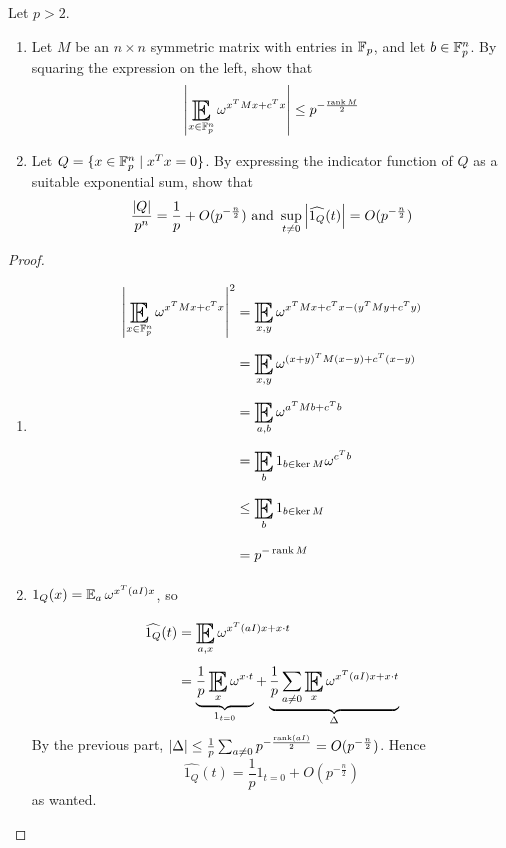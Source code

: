 \documentclass{article}
\begin{document}
\begin{problem}
  Let $p > 2$.
  \begin{enumerate}
    \item Let $M$ be an $n \times n$ symmetric matrix with entries in $\mathbb F_p$, and let $b \in \mathbb F_p^n$. By squaring the expression on the left, show that
    $$\abs{\E_{x \in \F_p^n} \omega^{x^T Mx + c^T x}} \le p^{-\frac{\rank M}2}$$
    \item Let $Q = \{x \in \mathbb F_p^n \mid x^T x = 0\}$. By expressing the indicator function of $Q$ as a suitable exponential sum, show that
    $$\frac{\left\lvert Q\right\rvert}{p^n} = \frac 1p + O(p^{-\frac n2}) \text{ and } \sup_{t \ne 0} \left\lvert \widehat{1_Q}(t)\right\rvert = O(p^{-\frac n2})$$
  \end{enumerate}
\end{problem}
\begin{proof}~
  \begin{enumerate}
    \item
    \begin{align*}
      \abs{\E_{x \in \F_p^n} \omega^{x^T Mx + c^T x}}^2
      & = \E_{x, y} \omega^{x^T Mx + c^T x - (y^T My + c^T y)} \\
      & = \E_{x, y} \omega^{(x + y)^T M(x - y) + c^T(x - y)} \\
      & = \E_{a, b} \omega^{a^T Mb + c^Tb} \\
      & = \E_b 1_{b \in \ker M} \omega^{c^Tb} \\
      & \le \E_b 1_{b \in \ker M} \\
      & = p^{-\rank M}
    \end{align*}
    \item $1_Q(x) = \E_a \omega^{x^T(aI)x}$, so
    \begin{align*}
      \widehat{1_Q}(t)
      & = \E_{a, x} \omega^{x^T(aI)x + x \cdot t} \\
      & = \underbrace{\frac 1p \E_x \omega^{x \cdot t}}_{1_{t = 0}} + \underbrace{\frac 1p \sum_{a \ne 0} \E_x \omega^{x^T (aI) x + x \cdot t}}_\Delta
    \end{align*}
    By the previous part, $\left\lvert \Delta\right\rvert \le \frac 1p \sum_{a \ne 0} p^{-\frac{\operatorname{rank}(aI)}2} = O(p^{-\frac n2})$. Hence
    $$\widehat{1_Q}(t) = \frac 1p 1_{t = 0} + O(p^{-\frac n2})$$
    as wanted.
  \end{enumerate}
\end{proof}
\end{document}
